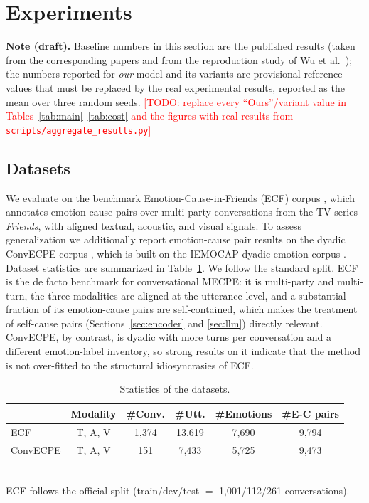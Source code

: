 \documentclass[journal]{IEEEtran}
\newcommand{\todo}[1]{\textcolor{red}{[TODO: #1]}}
\begin{document}
\section{Experiments}
\label{sec:exp}
\noindent\textbf{Note (draft).} Baseline numbers in this section are the published results
(taken from the corresponding papers and from the reproduction study of Wu et
al.~\cite{wu2025decdebate}); the numbers reported for \emph{our} model and its variants are
provisional reference values that must be replaced by the real experimental results, reported
as the mean over three random seeds. \todo{replace every ``Ours''/variant value in
Tables~\ref{tab:main}--\ref{tab:cost} and the figures with real results from
\texttt{scripts/aggregate\_results.py}}

\subsection{Datasets}
\label{sec:datasets}
We evaluate on the benchmark Emotion-Cause-in-Friends (ECF) corpus \cite{wang2023mecpe},
which annotates emotion-cause pairs over multi-party conversations from the TV series
\emph{Friends}, with aligned textual, acoustic, and visual signals. To assess
generalization we additionally report emotion-cause pair results on the dyadic ConvECPE
corpus \cite{poria2020convecpe}, which is built on the IEMOCAP dyadic emotion corpus
\cite{busso2008iemocap}. Dataset statistics are summarized in
Table~\ref{tab:data}. We follow the standard split. ECF is the de facto benchmark for
conversational MECPE: it is multi-party and multi-turn, the three modalities are aligned at
the utterance level, and a substantial fraction of its emotion-cause pairs are
self-contained, which makes the treatment of self-cause pairs (Sections~\ref{sec:encoder}
and \ref{sec:llm}) directly relevant. ConvECPE, by contrast, is dyadic with more turns per
conversation and a different emotion-label inventory, so strong results on it indicate that
the method is not over-fitted to the structural idiosyncrasies of ECF.

\begin{table}[t]
\centering
\caption{Statistics of the datasets.}
\label{tab:data}
\setlength{\tabcolsep}{4pt}
\begin{tabular}{lccccc}
\toprule
& Modality & \#Conv. & \#Utt. & \#Emotions & \#E-C pairs \\
\midrule
ECF \cite{wang2023mecpe}          & T, A, V & 1{,}374 & 13{,}619 & 7{,}690 & 9{,}794 \\
ConvECPE \cite{poria2020convecpe} & T, A, V & 151     & 7{,}433  & 5{,}725 & 9{,}473 \\
\bottomrule
\end{tabular}
\\[2pt]
{\footnotesize ECF follows the official split (train/dev/test $=$ 1{,}001/112/261
conversations).}
\end{table}
\end{document}
